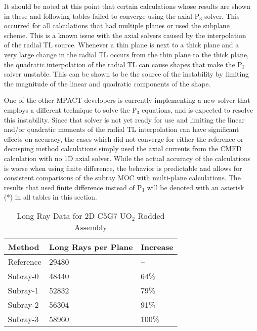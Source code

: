It should be noted at this point that certain calculations whose results are shown in these and following tables failed to converge using the axial P$_3$ solver.  This occurred for all calculations that had multiple planes or used the subplane scheme.  This is a known issue with the axial solvers caused by the interpolation of the radial TL source.  Whenever a thin plane is next to a thick plane and a very large change in the radial TL occurs from the thin plane to the thick plane, the quadratic interpolation of the radial TL can cause shapes that make the P$_3$ solver unstable.  This can be shown to be the source of the instability by limiting the magnitude of the linear and quadratic components of the shape.

One of the other MPACT developers is currently implementing a new solver that employs a different technique to solve the P$_3$ equations, and is expected to resolve this instability.  Since that solver is not yet ready for use and limiting the linear and/or quadratic moments of the radial TL interpolation can have significant effects on accuracy, the cases which did not converge for either the reference or decusping method calculations simply used the axial currents from the CMFD calculation with no 1D axial solver.  While the actual accuracy of the calculations is worse when using finite difference, the behavior is predictable and allows for consistent comparisons of the subray MOC with multi-plane calculations.  The results that used finite difference instead of P$_3$ will be denoted with an asterisk (*) in all tables in this section.

\begin{table}[h]
    \centering
    \caption{Long Ray Data for 2D C5G7 UO\texorpdfstring{$_2$}{2} Rodded Assembly}\label{t:subray-data-2dassembly}
    \begin{tabular}{l l l}\toprule
        Method & Long Rays per Plane & Increase \\\midrule
        Reference & 29480 & -- \\
        Subray-0 & 48440 & 64\% \\
        Subray-1 & 52832 & 79\% \\
        Subray-2 & 56304 & 91\% \\
        Subray-3 & 58960 & 100\% \\
        \bottomrule
    \end{tabular}
\end{table}

